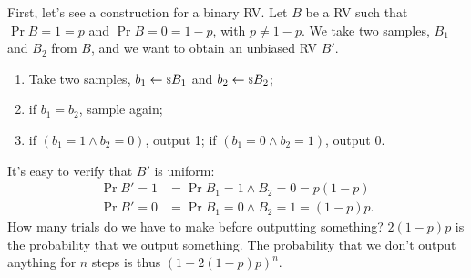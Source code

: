 First, let's see a construction for a binary \ac{RV}.
Let $B$ be a \ac{RV} such that $\Pr{B = 1} = p$ and $\Pr{B = 0} = 1-p$, with $p \neq 1-p$.
We take two samples, $B_1$ and $B_2$ from $B$, and we want to obtain an unbiased \ac{RV} $B'$.
\begin{enumerate}
	\item Take two samples, $b_1 \leftarrow {\scriptstyle \$} {B_1}$ and $b_2 \leftarrow {\scriptstyle \$} {B_2}$;
	\item if $b_1 = b_2$, sample again;
	\item if $(b_1 = 1 \land b_2 = 0)$, output 1; if $(b_1 = 0 \land b_2 = 1)$, output 0.
\end{enumerate}
It's easy to verify that $B'$ is uniform:
\begin{align*}
	\Pr{B' = 1} & = \Pr{B_1 = 1 \land B_2 = 0} = p (1-p) \\
	\Pr{B' = 0} & = \Pr{B_1 = 0 \land B_2 = 1} = (1-p) p.
\end{align*}
How many trials do we have to make before outputting something?
$2(1-p)p$ is the probability that we output something.
The probability that we don't output anything for $n$ steps is thus $(1 - 2(1-p)p)^n$.


